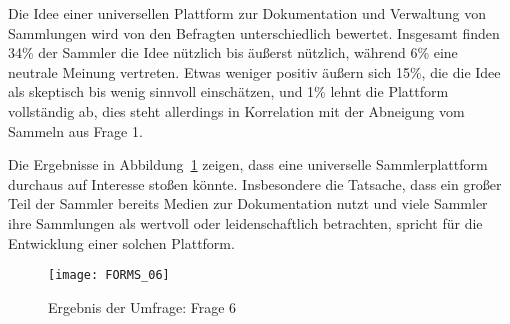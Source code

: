 Die Idee einer universellen Plattform zur Dokumentation und Verwaltung von Sammlungen wird von den Befragten unterschiedlich bewertet.
Insgesamt finden 34\% der Sammler die Idee nützlich bis äußerst nützlich, während 6\% eine neutrale Meinung vertreten.
Etwas weniger positiv äußern sich 15\%, die die Idee als skeptisch bis wenig sinnvoll einschätzen, und 1\% lehnt die Plattform vollständig ab, dies steht allerdings in Korrelation mit der Abneigung vom Sammeln aus Frage 1.\par

Die Ergebnisse in Abbildung~\ref{fig:forms_result_06} zeigen, dass eine universelle Sammlerplattform durchaus auf Interesse stoßen könnte.
Insbesondere die Tatsache, dass ein großer Teil der Sammler bereits Medien zur Dokumentation nutzt und viele Sammler ihre Sammlungen als wertvoll oder leidenschaftlich betrachten, spricht für die Entwicklung einer solchen Plattform. \par

\begin{figure}[h!]
    \centering
    \texttt{[image: FORMS\_06]}
    \caption{Ergebnis der Umfrage: Frage 6}
    \label{fig:forms_result_06}
\end{figure}

